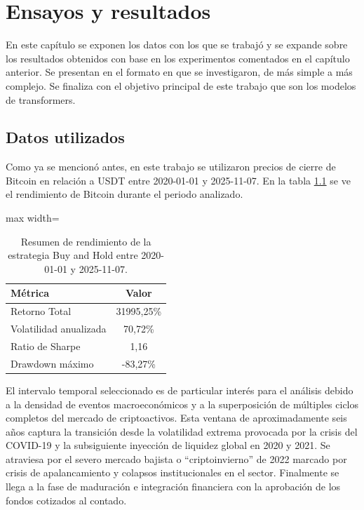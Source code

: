 
\chapter{Ensayos y resultados} %

\label{Chapter4} %
En este capítulo se exponen los datos con los que se trabajó y se expande sobre los resultados obtenidos con base en los experimentos comentados en el capítulo anterior. Se presentan en el formato en que se investigaron, de más simple a más complejo. Se finaliza con el objetivo principal de este trabajo que son los modelos de transformers.

\section{Datos utilizados}

Como ya se mencionó antes, en este trabajo se utilizaron precios de cierre de Bitcoin en relación a USDT entre 2020-01-01 y 2025-11-07. En la tabla \ref{tab:buy_and_hold} se ve el rendimiento de Bitcoin durante el periodo analizado.

\begin{table}[h]
  \centering
  \caption[Resumen Buy and Hold]{Resumen de rendimiento de la estrategia Buy and Hold entre 2020-01-01 y 2025-11-07.}
  \small
  \begin{adjustbox}{max width=\textwidth}
  \begin{tabular}{l c}
    \toprule
    \textbf{Métrica} & \textbf{Valor} \\
    \midrule
    Retorno Total & 31995,25\% \\
    Volatilidad anualizada & 70,72\% \\
    Ratio de Sharpe & 1,16 \\
    Drawdown máximo & -83,27\% \\
    \bottomrule
  \end{tabular}
  \end{adjustbox}
  \label{tab:buy_and_hold}
\end{table}

El intervalo temporal seleccionado es de particular interés para el análisis debido a la densidad de eventos macroeconómicos y a la superposición de múltiples ciclos completos del mercado de criptoactivos. Esta ventana de aproximadamente seis años captura la transición desde la volatilidad extrema provocada por la crisis del COVID-19 y la subsiguiente inyección de liquidez global en 2020 y 2021. Se atraviesa por el severo mercado bajista o ``criptoinvierno'' de 2022 marcado por crisis de apalancamiento y colapsos institucionales en el sector. Finalmente se llega a la fase de maduración e integración financiera con la aprobación de los fondos cotizados al contado.

